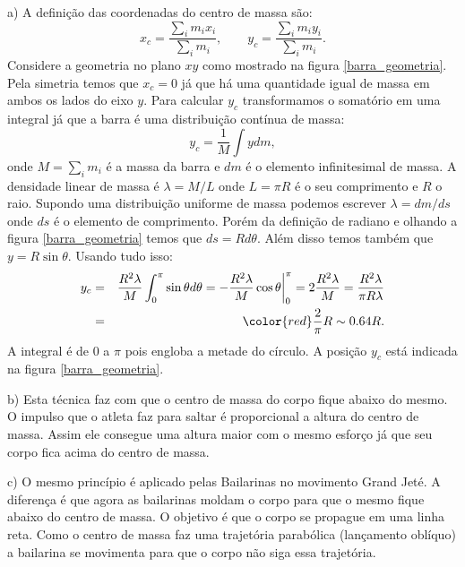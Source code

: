 \documentclass[12pt]{article}
\newenvironment{problem}[2][{\color{red}Problema}]{\begin{trivlist}
\item[\hskip \labelsep {\bfseries #1}\hskip \labelsep {\bfseries #2.}]}{\end{trivlist}}
\begin{document}
\begin{problem}{5}
a) A definição das coordenadas do centro de massa são:
\begin{equation}
x_c = \dfrac{\sum_i m_i x_i}{\sum_i m_i}, \qquad y_c = \dfrac{\sum_i m_i y_i}{\sum_i m_i}. \nonumber
\end{equation}
Considere a geometria no plano $xy$ como mostrado na figura \ref{barra_geometria}. Pela simetria temos que $x_c = 0$ já que há uma quantidade igual de massa em ambos os lados do eixo $y$. Para calcular $y_c$ transformamos o somatório em uma integral já que a barra é uma distribuição contínua de massa:
\begin{equation}
y_c = \dfrac{1}{M} \int y dm, \nonumber
\end{equation}
onde $M=\sum_i m_i$ é a massa da barra e $dm$ é o elemento infinitesimal de massa. A densidade linear de massa é $\lambda = M/L$ onde $L=\pi R$ é o seu comprimento e $R$ o raio. Supondo uma distribuição uniforme de massa podemos escrever $\lambda = dm/ds$ onde $ds$ é o elemento de comprimento. Porém da definição de radiano e olhando a figura \ref{barra_geometria} temos que $ds = R d\theta$. Além disso temos também que $y=R\sin \theta$. Usando tudo isso:
\begin{eqnarray}
y_c &=& \dfrac{R^2 \lambda}{M} \int_0^{\pi}  \sin \theta  d\theta = - \dfrac{R^2 \lambda}{M} \cos \theta \bigg\rvert_0^{\pi} = 2 \dfrac{R^2 \lambda}{M} = \dfrac{R^2 \lambda}{\pi R \lambda}  \nonumber \\
 &=& {\color{red} \dfrac{2}{\pi}R \sim 0.64 R}. \nonumber
\end{eqnarray}
A integral é de 0 a $\pi$ pois engloba a metade do círculo. A posição $y_c$ está indicada na figura \ref{barra_geometria}.

\noindent
b) Esta técnica faz com que o centro de massa do corpo fique abaixo do mesmo. O impulso que o atleta faz para saltar é proporcional a altura do centro de massa. Assim ele consegue uma altura maior com o mesmo esforço já que seu corpo fica acima do centro de massa.

\noindent
c) O mesmo princípio é aplicado pelas Bailarinas no movimento Grand Jeté. A diferença é que agora as bailarinas moldam o corpo para que o mesmo fique abaixo do centro de massa. O objetivo é que o corpo se propague em uma linha reta. Como o centro de massa faz uma trajetória parabólica (lançamento oblíquo) a bailarina se movimenta para que o corpo não siga essa trajetória.
\end{problem}
\end{document}
